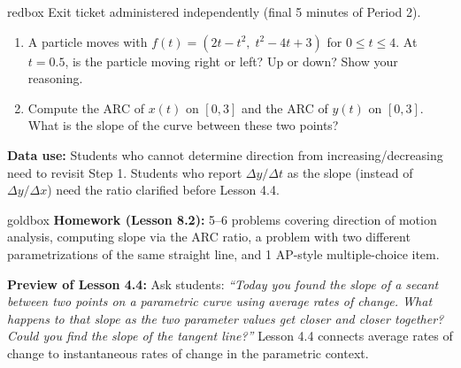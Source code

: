 \documentclass[10pt]{article}
\begin{document}
\begin{skillbox}{redbox}
Exit ticket administered independently (final 5 minutes of Period 2).

\begin{enumerate}[leftmargin=1.4em, itemsep=4pt]
  \item A particle moves with $f(t) = (2t - t^2,\; t^2 - 4t + 3)$ for
    $0 \le t \le 4$. At $t = 0.5$, is the particle moving right or
    left? Up or down? Show your reasoning.
  \item Compute the ARC of $x(t)$ on $[0, 3]$ and the ARC of $y(t)$
    on $[0, 3]$. What is the slope of the curve between these two
    points?
\end{enumerate}

\textbf{Data use:} Students who cannot determine direction from
increasing/decreasing need to revisit Step 1. Students who report
$\Delta y / \Delta t$ as the slope (instead of $\Delta y / \Delta x$)
need the ratio clarified before Lesson 4.4.
\end{skillbox}

\vspace{0.08in}

\begin{skillbox}{goldbox}
\textbf{Homework (Lesson 8.2):} 5--6 problems covering direction of
motion analysis, computing slope via the ARC ratio, a problem with two
different parametrizations of the same straight line, and 1 AP-style
multiple-choice item.

\textbf{Preview of Lesson 4.4:} Ask students: \textit{``Today you found
the slope of a secant between two points on a parametric curve using average
rates of change. What happens to that slope as the two parameter values
get closer and closer together? Could you find the slope of the
\emph{tangent} line?''} Lesson 4.4 connects average rates of change
to instantaneous rates of change in the parametric context.
\end{skillbox}
\end{document}
